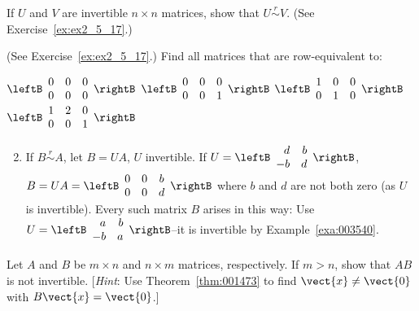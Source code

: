 \begin{multicols}{2}
\begin{ex}
If $U$ and $V$ are invertible $n \times n$ matrices, show that $U \overset{r}{\sim} V$. (See Exercise~\ref{ex:ex2_5_17}.)
\end{ex}

\begin{ex}
(See Exercise~\ref{ex:ex2_5_17}.) Find all matrices that are row-equivalent to:
\begin{exenumerate}
\exitem $\leftB \begin{array}{rrr}
0 & 0 & 0 \\
0 & 0 & 0
\end{array} \rightB$
\exitem $\leftB \begin{array}{rrr}
0 & 0 & 0 \\
0 & 0 & 1
\end{array} \rightB$
\exitem $\leftB \begin{array}{rrr}
1 & 0 & 0 \\
0 & 1 & 0
\end{array} \rightB$
\exitem $\leftB \begin{array}{rrr}
1 & 2 & 0 \\
0 & 0 & 1
\end{array} \rightB$
\end{exenumerate}
\begin{sol}
\begin{enumerate}[label={\alph*.}]
\setcounter{enumi}{1}
\item  If $B \overset{r}{\sim} A$,
 let $B = UA$, $U$ invertible. If $U = \leftB \begin{array}{rr}
 d & b \\
 -b & d
 \end{array} \rightB$, $B = UA = \leftB \begin{array}{ccc}
 0 & 0 & b \\
 0 & 0 & d
 \end{array} \rightB$
 where $b$ and $d$ are not both zero (as $U$ is invertible). Every such matrix $B$ arises in this way: Use $U = \leftB \begin{array}{rr}
 a & b \\
 -b & a
 \end{array} \rightB$--it is invertible by Example~\ref{exa:003540}.

\end{enumerate}
\end{sol}
\end{ex}

\begin{ex}
Let $A$ and $B$ be $m \times n$ and $n \times m$ matrices, respectively. If $m > n$, show that $AB$ is not invertible. [\textit{Hint}: Use Theorem~\ref{thm:001473} to find $\vect{x} \neq \vect{0}$ with $B\vect{x} = \vect{0}$.]
\end{ex}


\end{multicols}
